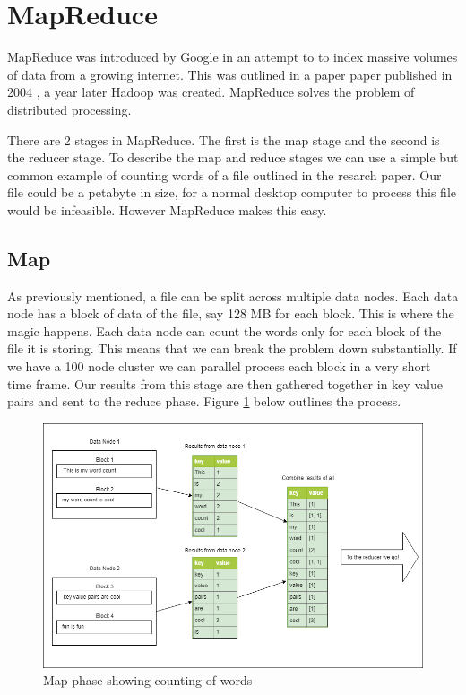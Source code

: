 \section{MapReduce}

MapReduce was introduced by Google in an attempt to to index massive volumes of data from a growing internet. This was outlined in a paper paper published in 2004 \cite{mapreduce}, a year later Hadoop was created. MapReduce solves the problem of distributed processing.

There are 2 stages in MapReduce. The first is the map stage and the second is the reducer stage. To describe the map and reduce stages we can use a simple but common example of counting words of a file outlined in the resarch paper\cite{mapreduce}. Our file could be a petabyte in size, for a normal desktop computer to process this file would be infeasible. However MapReduce makes this easy.

\subsection{Map}

As previously mentioned, a file can be split across multiple data nodes. Each data node has a block of data of the file, say 128 MB for each block. This is where the magic happens. Each data node can count the words only for each block of the file it is storing. This means that we can break the problem down substantially. If we have a 100 node cluster we can parallel process each block in a very short time frame. Our results from this stage are then gathered together in key value pairs and sent to the reduce phase. Figure \ref{fig:map-phase} below outlines the process.

\begin{figure}[H]
  \includegraphics[width=\linewidth]{./images/map-phase.png}
  \caption{Map phase showing counting of words}
  \label{fig:map-phase}
\end{figure}

